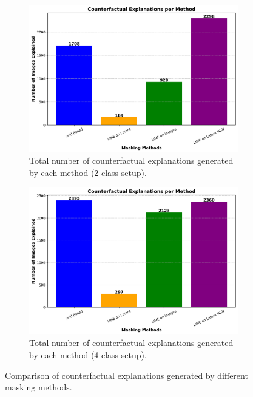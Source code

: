 \begin{figure}[htbp]
    \centering
    \begin{subfigure}{0.45\textwidth}
        \centering
        \includegraphics[width=\textwidth]{img/masking_results/bar_chart_explanations_2_class.png}
        \caption{Total number of counterfactual explanations generated by each method (2-class setup).}
        \label{fig:ce_count_binary}
    \end{subfigure}
    \hfill
    \begin{subfigure}{0.45\textwidth}
        \centering
        \includegraphics[width=\textwidth]{img/masking_results/bar_chart_explanations_4_class.png}
        \caption{Total number of counterfactual explanations generated by each method (4-class setup).}
        \label{fig:bar_chart_ce_count_multi}
    \end{subfigure}
    \caption{Comparison of counterfactual explanations generated by different masking methods.}
    \label{fig:ce_count_comparison}
\end{figure}


